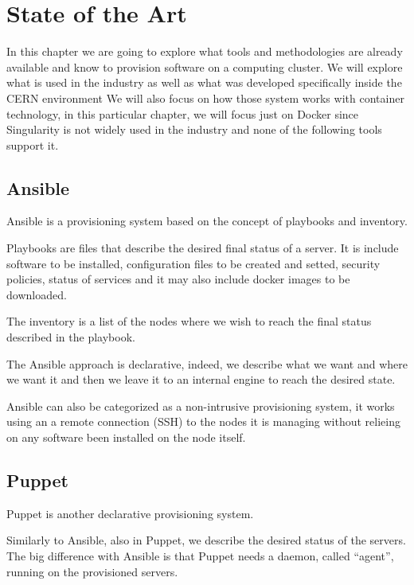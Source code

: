 \chapter{State of the Art}\label{ch:SoA}


In this chapter we are going to explore what tools and methodologies are already available and know to provision software on a computing cluster.
We will explore what is used in the industry as well as what was developed specifically inside the CERN environment
We will also focus on how those system works with container technology, in this particular chapter, we will focus just on Docker since Singularity is not widely used in the industry and none of the following tools support it.

\section{Ansible}

Ansible is a provisioning system based on the concept of playbooks and inventory.

Playbooks are files that describe the desired final status of a server. It is include software to be installed, configuration files to be created and setted, security policies, status of services and it may also include docker images to be downloaded.

The inventory is a list of the nodes where we wish to reach the final status described in the playbook.

The Ansible approach is declarative, indeed, we describe what we want and where we want it and then we leave it to an internal engine to reach the desired state.

Ansible can also be categorized as a non-intrusive provisioning system, it works using an a remote connection (SSH) to the nodes it is managing without relieing on any software been installed on the node itself.

\section{Puppet}

Puppet is another declarative provisioning system.

Similarly to Ansible, also in Puppet, we describe the desired status of the servers. The big difference with Ansible is that Puppet needs a daemon, called “agent”, running on the provisioned servers. 


